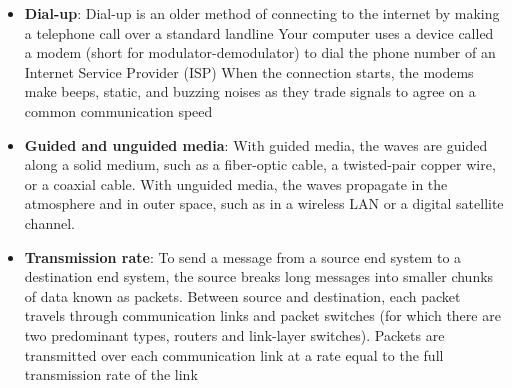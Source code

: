 \documentclass{report}
\begin{document}
\begin{itemize}
            \bigbreak \noindent 
            DHCP uses a four-step process to connect a device, often remembered by the acronym DORA: 
            \begin{itemize}
                \item \textbf{Discover:} The client device broadcasts a message on the network to find an available DHCP server.
                \item \textbf{Offer:} The DHCP server responds with an available IP address and network settings.
                \item \textbf{Request:} The client replies by formally requesting the offered IP address.
                \item \textbf{Acknowledge:} The server sends a final confirmation, granting the IP address for a set amount of time called a lease
            \end{itemize}
            Your internet provider only gives your home one single public IP address (the internet version of a mailing address).
            \begin{itemize}
                \item The Modem simply passes that single public IP address to whatever is plugged into it.
                \item The Router takes that single public IP address, hides it from the world, and generates hundreds of private local IP addresses (like 192.168.1.X) for your home.
            \end{itemize}
        \item \textbf{Dial-up}: Dial-up is an older method of connecting to the internet by making a telephone call over a standard landline
            \bigbreak \noindent 
            Your computer uses a device called a modem (short for modulator-demodulator) to dial the phone number of an Internet Service Provider (ISP)
            \bigbreak \noindent 
            When the connection starts, the modems make beeps, static, and buzzing noises as they trade signals to agree on a common communication speed
        \item \textbf{Guided and unguided media}: With guided media, the waves are guided along a solid medium, such as a fiber-optic cable, a twisted-pair copper wire, or a coaxial cable. With unguided media, the waves propagate in the atmosphere and in outer space, such as in a wireless LAN or a digital satellite channel.
        \item \textbf{Transmission rate}: To send a message from a source end system to a destination end system, the source breaks long messages into smaller chunks of data known as packets. Between source and destination, each packet travels through communication links and packet switches (for which there are two predominant types, routers and link-layer switches). Packets are transmitted over each communication link at a rate equal to the full transmission rate of the link

\end{itemize}
\end{document}
